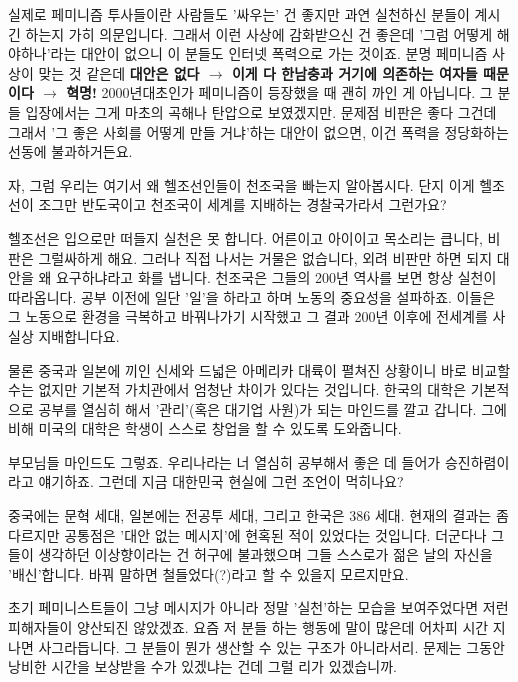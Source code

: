 실제로 페미니즘 투사들이란 사람들도 '싸우는' 건 좋지만 과연 실천하신 분들이 계시긴 하는지 가히 의문입니다.
그래서 이런 사상에 감화받으신 건 좋은데 '그럼 어떻게 해야하나'라는 대안이 없으니 이 분들도 인터넷 폭력으로 가는 것이죠.
분명 페미니즘 사상이 맞는 것 같은데 \textbf{대안은 없다 $\rightarrow$ 이게 다 한남충과 거기에 의존하는 여자들 때문이다 $\rightarrow$ 혁명!}
2000년대초인가 페미니즘이 등장했을 때 괜히 까인 게 아닙니다. 그 분들 입장에서는 그게 마초의 곡해나 탄압으로 보였겠지만.
문제점 비판은 좋다 그건데 그래서 '그 좋은 사회를 어떻게 만들 거냐'하는 대안이 없으면, 이건 폭력을 정당화하는 선동에 불과하거든요.
\vspace{5mm}

자, 그럼 우리는 여기서 왜 헬조선인들이 천조국을 빠는지 알아봅시다.
단지 이게 헬조선이 조그만 반도국이고 천조국이 세계를 지배하는 경찰국가라서 그런가요?
\vspace{5mm}

헬조선은 입으로만 떠들지 실천은 못 합니다. 어른이고 아이이고 목소리는 큽니다, 비판은 그럴싸하게 해요.
그러나 직접 나서는 거물은 없습니다, 외려 비판만 하면 되지 대안을 왜 요구하냐라고 화를 냅니다.
천조국은 그들의 200년 역사를 보면 항상 실천이 따라옵니다. 공부 이전에 일단 '일'을 하라고 하며 노동의 중요성을 설파하죠.
이들은 그 노동으로 환경을 극복하고 바꿔나가기 시작했고 그 결과 200년 이후에 전세계를 사실상 지배합니다요.
\vspace{5mm}

물론 중국과 일본에 끼인 신세와 드넓은 아메리카 대륙이 펼쳐진 상황이니 바로 비교할 수는 없지만
기본적 가치관에서 엄청난 차이가 있다는 것입니다.
한국의 대학은 기본적으로 공부를 열심히 해서 '관리'(혹은 대기업 사원)가 되는 마인드를 깔고 갑니다.
그에 비해 미국의 대학은 학생이 스스로 창업을 할 수 있도록 도와줍니다.
\vspace{5mm}

부모님들 마인드도 그렇죠. 우리나라는 너 열심히 공부해서 좋은 데 들어가 승진하렴이라고 얘기하죠.
그런데 지금 대한민국 현실에 그런 조언이 먹히나요?
\vspace{5mm}

중국에는 문혁 세대, 일본에는 전공투 세대, 그리고 한국은 386 세대.
현재의 결과는 좀 다르지만 공통점은 '대안 없는 메시지'에 현혹된 적이 있었다는 것입니다.
더군다나 그들이 생각하던 이상향이라는 건 허구에 불과했으며
그들 스스로가 젊은 날의 자신을 '배신'합니다. 바꿔 말하면 철들었다(?)라고 할 수 있을지 모르지만요.
\vspace{5mm}

초기 페미니스트들이 그냥 메시지가 아니라 정말 '실천'하는 모습을 보여주었다면 저런 피해자들이 양산되진 않았겠죠.
요즘 저 분들 하는 행동에 말이 많은데 어차피 시간 지나면 사그라듭니다. 그 분들이 뭔가 생산할 수 있는 구조가 아니라서리.
문제는 그동안 낭비한 시간을 보상받을 수가 있겠냐는 건데 그럴 리가 있겠습니까.
\vspace{5mm}

